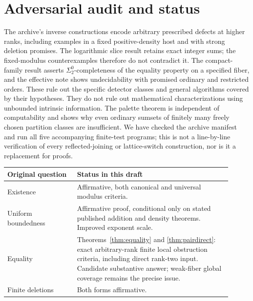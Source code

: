 \documentclass[11pt]{article}
\theoremstyle{remark}\newtheorem{remark}[theorem]{Remark}
\begin{document}
\section{Adversarial audit and status}
The archive's inverse constructions encode arbitrary prescribed defects at higher ranks, including examples in a fixed positive-density host and with strong deletion promises. The logarithmic slice result retains exact integer sums; the fixed-modulus counterexamples therefore do not contradict it. The compact-family result asserts $\Sigma^0_2$-completeness of the equality property on a specified fiber, and the effective note shows undecidability with promised ordinary and restricted orders. These rule out the specific detector classes and general algorithms covered by their hypotheses. They do not rule out mathematical characterizations using unbounded intrinsic information. The palette theorem is independent of computability and shows why even ordinary sumsets of finitely many freely chosen partition classes are insufficient. We have checked the archive manifest and run all five accompanying finite-test programs; this is not a line-by-line verification of every reflected-joining or lattice-switch construction, nor is it a replacement for proofs.

\begin{center}\begin{tabular}{@{}p{0.29\linewidth}p{0.62\linewidth}@{}}\toprule
Original question & Status in this draft\\\midrule
Existence & Affirmative, both canonical and universal modulus criteria.\\
Uniform boundedness & Affirmative proof, conditional only on stated published addition and density theorems. Improved exponent scale.\\
Equality & Theorems~\ref{thm:equality} and \ref{thm:pairdirect}: exact arbitrary-rank finite local obstruction criteria, including direct rank-two input. Candidate substantive answer; weak-fiber global coverage remains the precise issue.\\
Finite deletions & Both forms affirmative.\\\bottomrule\end{tabular}\end{center}
\end{document}
